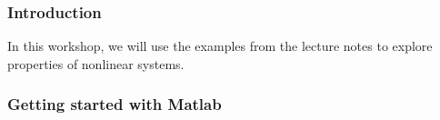 \documentclass[9pt]{beamer-control}
\begin{document}

\begin{frame}
\frametitle{Introduction}
In this workshop, we will use the examples from the lecture notes to explore properties of nonlinear systems.
\end{frame}


\begin{frame}[fragile]
\frametitle{Getting started with Matlab}



\end{frame}
\end{document}
